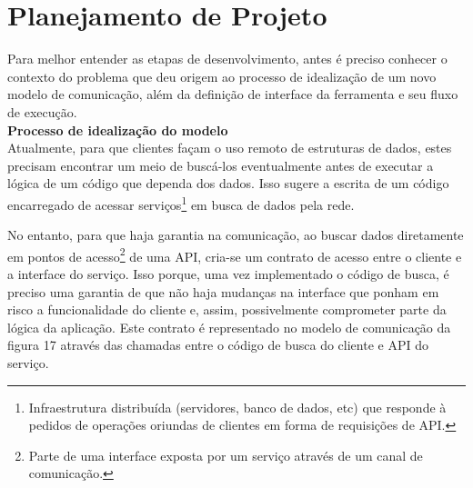 \section{Planejamento de Projeto}

Para melhor entender as etapas de desenvolvimento, antes é preciso conhecer o contexto do problema que deu origem ao processo de idealização de um novo modelo de comunicação, além da definição de interface da ferramenta e seu fluxo de execução. \\

\textbf{Processo de idealização do modelo} \\

Atualmente, para que clientes façam o uso remoto de estruturas de dados, estes precisam encontrar um meio de buscá-los eventualmente antes de executar a lógica de um código que dependa dos dados. Isso sugere a escrita de um código encarregado de acessar serviços\footnote{
  Infraestrutura distribuída (servidores, banco de dados, etc) que responde à pedidos de operações oriundas de clientes em forma de requisições de API.
} em busca de dados pela rede.

No entanto, para que haja garantia na comunicação, ao buscar dados diretamente em pontos de acesso\footnote{
  Parte de uma interface exposta por um serviço através de um canal de comunicação.
} de uma API, cria-se um contrato de acesso entre o cliente e a interface do serviço. Isso porque, uma vez implementado o código de busca, é preciso uma garantia de que não haja mudanças na interface que ponham em risco a funcionalidade do cliente e, assim, possivelmente comprometer parte da lógica da aplicação. Este contrato é representado no modelo de comunicação da figura 17 através das chamadas entre o código de busca do cliente e API do serviço.

